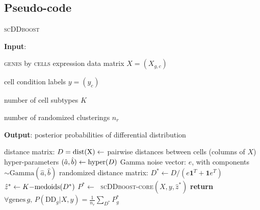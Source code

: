 \documentclass[aoas,preprint]{imsart}
\begin{document}
\subsection*{Pseudo-code}

\begin{algorithm}
\caption{\textsc{scDDboost}}\label{alg:scDDboost}
\raggedright\hspace*{\algorithmicindent} \textbf{Input}: \begin{list}{}{}
 \item  \textsc{genes} by \textsc{cells} expression data matrix $X=(X_{g,c})$
 \item  cell condition labels $y=(y_c)$
 \item  number of cell subtypes $K$
 \item number of randomized clusterings $n_r$
 \end{list}
\hspace*{\algorithmicindent} \textbf{Output}: posterior probabilities of differential distribution
\begin{algorithmic}[2]
\State distance matrix: $D=\rm{dist}(X) \gets$ pairwise distances between cells (columns of $X$)
\State hyper-parameters $(\hat a, \hat b) \gets {\mbox {\rm hyper}}(D)$
\Repeat
\State Gamma noise vector: $e$, with components $\sim \text{Gamma}(\hat a,\hat b)$
\State randomized distance matrix: $D^* \gets D / (e\textbf{1}^T +  \textbf{1}e^T)$
\State $\hat z^* \gets {\mbox {\rm $K-$medoids}}(D^*)$
\State $P^* \gets\;$ \textsc{scDDboost-core}$(X,y,\hat z^*)$
\State \textbf{return} $\forall \text{genes} \, g, \, P(\text{DD}_g|X,y) = \frac{1}{n_r}
   \sum_{D^*} P^*_g$
\EndProcedure
\end{algorithmic}
\end{algorithm}
\end{document}
